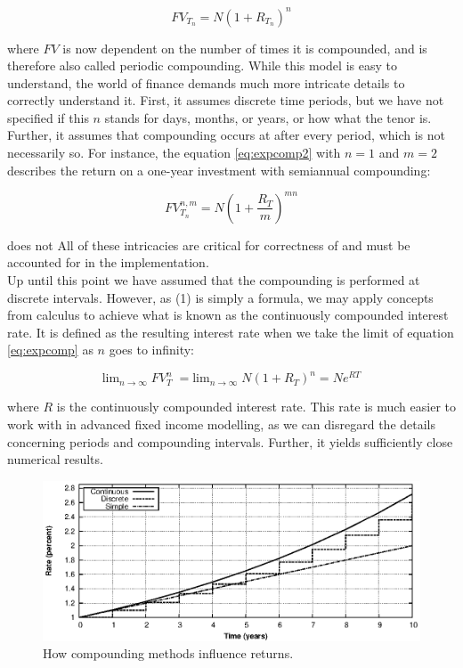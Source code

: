 \begin{equation}\label{eq:expcomp}
FV_{T_n} = N (1 + R_{T_n})^n
\end{equation}

where $FV$ is now dependent on the number of times it is compounded, and is 
therefore also called periodic compounding.
While this model is easy to understand, the world of finance demands much more 
intricate details to correctly understand it. First, it assumes 
discrete time periods, but we have not specified if this $n$ stands for days, 
months, or years, or how what the tenor is. Further, it assumes that compounding
occurs at after every period, which is not necessarily so. For instance, the
equation \ref{eq:expcomp2} with $n=1$ and $m=2$ describes the return on a one-year
investment with semiannual compounding:

\begin{equation}\label{eq:expcomp2}
FV_{T_n}^{n,m} = N (1 + \frac{R_T}{m})^{mn}
\end{equation}

does not  All of these intricacies are critical for correctness of \hql and must
be accounted for in the implementation.\\

Up until this point we have assumed that the compounding is performed at 
discrete intervals. However, as (1) is simply a formula, we may apply concepts 
from calculus to achieve what is known as the continuously compounded interest 
rate. It is defined as the resulting interest rate when we take the limit of 
equation \ref{eq:expcomp} as $n$ goes to infinity:

\begin{equation}
\text{lim}_{n \rightarrow \infty}\; FV_T^n \; = \text{lim}_{n \rightarrow \infty}\; N (1 + R_T)^n
= N e^{RT}
\end{equation}

where $R$ is the continuously compounded interest rate. This rate is much easier
to work with in advanced fixed income modelling\cite{cmunk}, as we can disregard
the details concerning periods and compounding intervals. Further, it yields
sufficiently close numerical results.

\begin{figure}[!htb]
\centering
\includegraphics[scale=1.2]{images/comp02.eps}
\caption{How compounding methods influence returns.}
\label{fig:comp02}
\end{figure}


